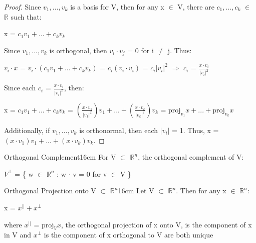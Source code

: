     \begin{proof}
        Since $v_1,...,v_k$ is a basis for V, then for any x $\in$ V,
        there are $c_1,...,c_k$ $\in$ $\mathbb{R}$ such that:

        \hspace{0.5cm}
        x = $c_1v_1 + ... + c_kv_k$

        Since $v_1,...,v_k$ is orthogonal, then
        $v_i \cdot v_j$ = 0 for i $\not =$ j. Thus:

        \hspace{0.5cm}
        $v_i \cdot x$ = $v_i \cdot (c_1v_1 + ... + c_kv_k)$
        = $c_i(v_i \cdot v_i)$
        = $c_i|v_i|^2$
        \hspace{0.5cm}
        $\Rightarrow$
        \hspace{0.5cm}
        $c_i$ = $\frac{x \cdot v_i}{|v_i|^2}$

        Since each $c_i$ = $\frac{x \cdot v_i}{|v_i|^2}$, then:
        
        \hspace{0.5cm}
        x = $c_1v_1 + ... + c_kv_k$
        = $(\frac{x \cdot v_1}{|v_1|^2})v_1
            + ... + (\frac{x \cdot v_k}{|v_k|^2})v_k$
        = $\text{proj}_{v_1}x + ... + \text{proj}_{v_k}x$

        Additionally, if $v_1,...,v_k$ is orthonormal,
        then each $|v_i|$ = 1. Thus,
        x = $(x \cdot v_1)v_1 + ... + (x \cdot v_k)v_k$.
    \end{proof}

    \vspace{0.5cm}



    \begin{definition}{Orthogonal Complement}{16cm}
        For V $\subset$ $\mathbb{R}^n$, the {\color{lblue} orthogonal complement}
        of V:

        \hspace{0.5cm}
        $V^{\perp}$
        = \{ w $\in$ $\mathbb{R}^n$ : w $\cdot$ v = 0 for v $\in$ V \}
    \end{definition}

    \vspace{0.5cm}



    \begin{wtheorem}{Orthogonal Projection onto V $\subset$ $\mathbb{R}^n$}{16cm}
        Let V $\subset$ $\mathbb{R}^n$. Then for any x $\in$ $\mathbb{R}^n$:

        \hspace{0.5cm}
        x = $x^{||} + x^{\perp}$

        where $x^{||}$ = $\text{proj}_Vx$,
        the {\color{lblue} orthogonal projection} of x onto V,
        is the component of x in V
        and $x^{\perp}$ is the component of x orthogonal to V
        are both unique
    \end{wtheorem}

